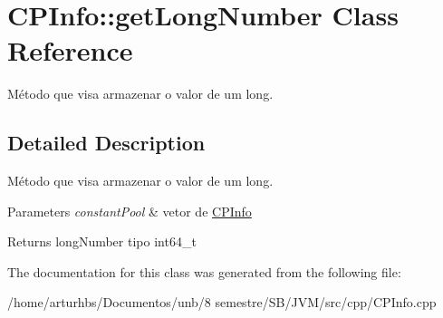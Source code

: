 \hypertarget{classCPInfo_1_1getLongNumber}{}\section{C\+P\+Info\+:\+:get\+Long\+Number Class Reference}
\label{classCPInfo_1_1getLongNumber}


Método que visa armazenar o valor de um long.  




\subsection{Detailed Description}
Método que visa armazenar o valor de um long. 


\begin{DoxyParams}{Parameters}
{\em constant\+Pool} & vetor de \hyperlink{classCPInfo}{C\+P\+Info} \\
\hline
\end{DoxyParams}
\begin{DoxyReturn}{Returns}
long\+Number tipo int64\+\_\+t 
\end{DoxyReturn}


The documentation for this class was generated from the following file\+:\begin{DoxyCompactItemize}
\item 
/home/arturhbs/\+Documentos/unb/8 semestre/\+S\+B/\+J\+V\+M/src/cpp/C\+P\+Info.\+cpp\end{DoxyCompactItemize}
